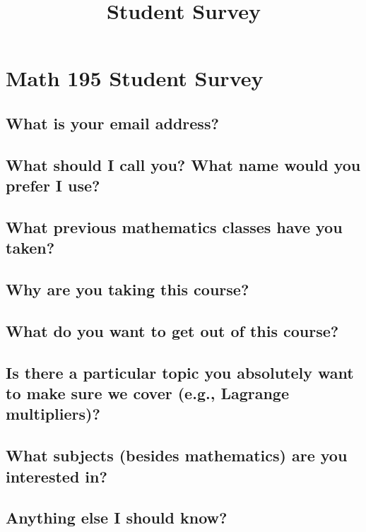 \documentclass[12pt]{article}
\title{Student Survey}
\begin{document}
\section*{Math 195 Student Survey}

\subsection*{What is your email address?}
\vfill

\subsection*{What should I call you?  What name would you prefer I use?}
\vfill

\subsection*{What previous mathematics classes have you taken?}
\vfill



\subsection*{Why are you taking this course?}
\vfill

\subsection*{What do you want to get out of this course?}
\vfill

\subsection*{Is there a particular topic you absolutely want to make sure we cover (e.g., Lagrange multipliers)?}
\vfill


\subsection*{What subjects (besides mathematics) are you interested in?}
\vfill

\subsection*{Anything else I should know?}
\vfill
\end{document}

